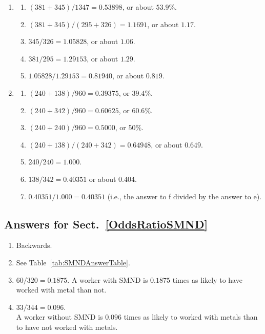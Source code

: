 \documentclass[
  11pt,
  a4paper,
  krantz2]{krantz}
\providecommand{\tightlist}{%
  \setlength{\itemsep}{0pt}\setlength{\parskip}{0pt}}
\begin{document}
\begin{footnotesize}
\begin{enumerate}
\def\labelenumi{\arabic{enumi}.}
\tightlist
\item
  \begin{enumerate}
  \def\labelenumii{\alph{enumii}.}
  \tightlist
  \item
    \((381 + 345)/1347 = 0.53898\), or about \(53.9\)\%.
  \item
    \((381 + 345)/(295 + 326) = 1.1691\), or about \(1.17\).
  \item
    \(345/326 = 1.05828\), or about \(1.06\).
  \item
    \(381/295 = 1.29153\), or about \(1.29\).
  \item
    \(1.05828 / 1.29153 = 0.81940\), or about \(0.819\).
  \end{enumerate}
\item
  \begin{enumerate}
  \def\labelenumii{\alph{enumii}.}
  \tightlist
  \item
    \((240 + 138)/960 = 0.39375\), or \(39.4\)\%.
  \item
    \((240 + 342)/960 = 0.60625\), or \(60.6\)\%.
  \item
    \((240 + 240)/960 = 0.5000\), or \(50\)\%.
  \item
    \((240 + 138)/(240 + 342) = 0.64948\), or about \(0.649\).
  \item
    \(240/240 = 1.000\).
  \item
    \(138/342 = 0.40351\) or about \(0.404\).
  \item
    \(0.40351/ 1.000 = 0.40351\) (i.e., the answer to f divided by the answer to e).
  \end{enumerate}
\end{enumerate}

\subsection*{Answers for Sect.~\ref{OddsRatioSMND}}\label{answers-for-sect.-refoddsratiosmnd}

\begin{enumerate}
\def\labelenumi{\arabic{enumi}.}
\tightlist
\item
  Backwards.
\item
  See Table~\ref{tab:SMNDAnswerTable}.
\item
  \(60/320 = 0.1875\).
  A worker with SMND is \(0.1875\) times as likely to have worked with metal than not.
\item
  \(33/344 = 0.096\).\\
  A worker without SMND is \(0.096\) times as likely to worked with metals than to have not worked with metals.
\end{enumerate}


\end{footnotesize}
\end{document}

